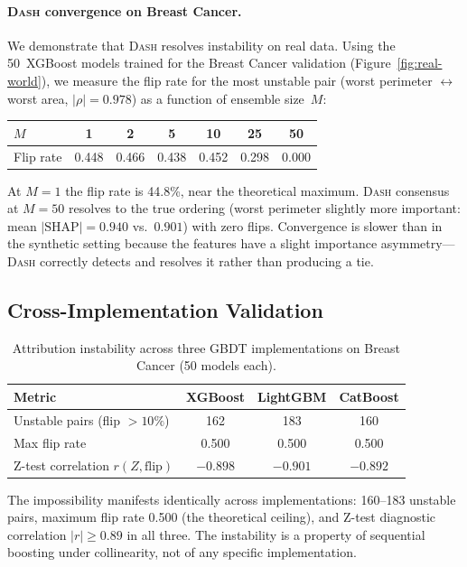 \documentclass{article}
\newcommand{\SHAP}{\mathrm{SHAP}}
\newcommand{\DASH}{\textsc{Dash}}
\begin{document}
\paragraph{\DASH{} convergence on Breast Cancer.}
We demonstrate that \DASH{} resolves instability on real data.
Using the 50~XGBoost models trained for the Breast Cancer validation
(Figure~\ref{fig:real-world}), we measure the flip rate for the most
unstable pair (worst perimeter $\leftrightarrow$ worst area,
$|\rho|{=}0.978$) as a function of ensemble size~$M$:

\begin{center}
\small
\begin{tabular}{@{}lcccccc@{}}
\toprule
$M$ & 1 & 2 & 5 & 10 & 25 & 50 \\
\midrule
Flip rate & 0.448 & 0.466 & 0.438 & 0.452 & 0.298 & 0.000 \\
\bottomrule
\end{tabular}
\end{center}

At $M{=}1$ the flip rate is 44.8\%, near the theoretical maximum. \DASH{} consensus at $M{=}50$ resolves to the true ordering (worst perimeter slightly more important: mean $|\SHAP| = 0.940$ vs.\ $0.901$) with zero flips. Convergence is slower than in the synthetic setting because the features have a slight importance asymmetry---\DASH{} correctly detects and resolves it rather than producing a tie.

\subsection{Cross-Implementation Validation}

\begin{table}[t]
\centering
\caption{Attribution instability across three GBDT implementations on Breast Cancer (50 models each).}
\label{tab:cross-impl}
\small
\begin{tabular}{@{}lccc@{}}
\toprule
Metric & XGBoost & LightGBM & CatBoost \\
\midrule
Unstable pairs (flip $> 10\%$) & 162 & 183 & 160 \\
Max flip rate & 0.500 & 0.500 & 0.500 \\
Z-test correlation $r(Z, \text{flip})$ & $-0.898$ & $-0.901$ & $-0.892$ \\
\bottomrule
\end{tabular}
\end{table}

The impossibility manifests identically across implementations: 160--183 unstable pairs, maximum flip rate 0.500 (the theoretical ceiling), and Z-test diagnostic correlation $|r| \geq 0.89$ in all three. The instability is a property of sequential boosting under collinearity, not of any specific implementation.
\end{document}
